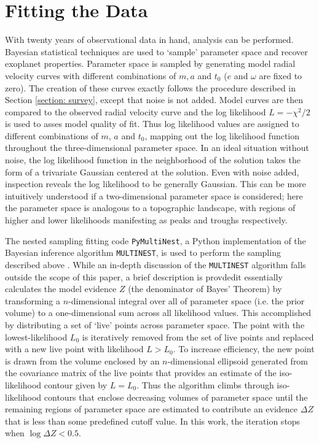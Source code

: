 \documentclass[12pt,manuscript]{aastex}
\begin{document}
\section{Fitting the Data}
\label{section: fitting}

With twenty years of observational data in hand, analysis can be performed. 
Bayesian statistical techniques are used to `sample' parameter space and recover exoplanet properties.
Parameter space is sampled by generating model radial velocity curves with different combinations of $m, a$ and $t_0$ ($e$ and $\omega$ are fixed to zero). 
The creation of these curves exactly follows the procedure described in Section \ref{section: survey}, except that noise is not added.
Model curves are then compared to the observed radial velocity curve and the log likelihood $L=-\chi^2/2$ is used to asses model quality of fit.
Thus log likelihood values are assigned to different combinations of $m$, $a$ and $t_0$, mapping out the log likelihood function throughout the three-dimensional parameter space.
In an ideal situation without noise, the log likelihood function in the neighborhood of the solution takes the form of a trivariate Gaussian centered at the solution.
Even with noise added, inspection reveals the log likelihood to be generally Gaussian.
This can be more intuitively understood if a two-dimensional parameter space is considered; here the parameter space is analogous to a topographic landscape, with regions of higher and lower likelihoods manifesting as peaks and troughs respectively.

The nested sampling fitting code \texttt{PyMultiNest}, a Python implementation of the Bayesian inference algorithm \texttt{MULTINEST}, is used to perform the sampling described above \citep{buchner14,feroz09}.
While an in-depth discussion of the \texttt{MULTINEST} algorithm falls outside the scope of this paper, a brief description is provdedit essentially calculates the model evidence $Z$ (the denominator of Bayes' Theorem) by transforming a $n$-dimensional integral over all of parameter space (i.e. the prior volume) to a one-dimensional sum across all likelihood values. 
This accomplished by distributing a set of `live' points across parameter space. 
The point with the lowest-likelihood $L_0$ is iteratively removed from the set of live points and replaced with a new live point with likelihood $L > L_0$.
To increase efficiency, the new point is drawn from the volume enclosed by an $n$-dimensional ellipsoid generated from the covariance matrix of the live points that provides an estimate of the iso-likelihood contour given by $L=L_0$.
Thus the algorithm climbs through iso-likelihood contours that enclose decreasing volumes of parameter space until the remaining regions of parameter space are estimated to contribute an evidence $\Delta Z$ that is less than some predefined cutoff value. 
In this work, the iteration stops when $\log \Delta Z <0.5$.
\end{document}
